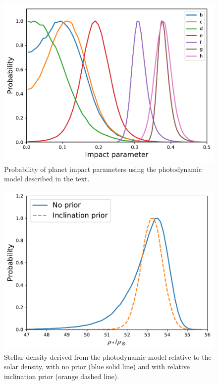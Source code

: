 \documentclass[fleqn,usenatbib]{mnras} %
\begin{document}
\begin{figure}
    \centering
    \includegraphics[width=\hsize]{figures/impact_parameter_noprior.pdf}
    \caption{Probability of planet impact parameters using the photodynamic model described in the text.}
    \label{fig:impact_parameter}
\end{figure}

\begin{figure}
    \centering
    \includegraphics[width=\hsize]{figures/stellar_density_noprior.pdf}
    \caption{Stellar density derived from the photodynamic model relative to the solar density, with no prior (blue solid line) and with relative inclination prior (orange dashed line).}
    \label{fig:stellar_density}
\end{figure}
\end{document}
